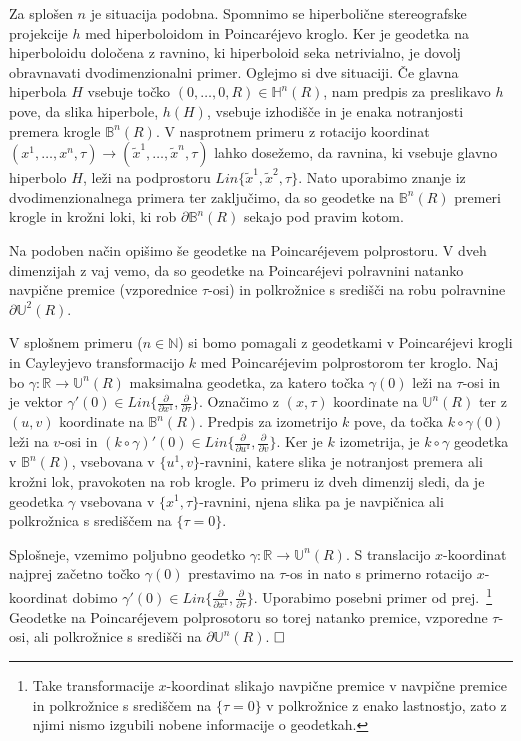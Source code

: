 \documentclass[a4paper]{article}
\def\qed{$\hfill\Box$}   %
\begin{document}
Za splošen $n$ je situacija podobna. Spomnimo se hiperbolične stereografske projekcije $h$ med hiperboloidom in Poincar\'ejevo kroglo. Ker je geodetka na hiperboloidu določena z ravnino, ki hiperboloid seka netrivialno, je dovolj obravnavati dvodimenzionalni primer. Oglejmo si dve situaciji. Če glavna hiperbola $H$ vsebuje točko $(0, \dots , 0,R) \in \mathbb{H}^{n}(R)$, nam predpis za preslikavo $h$ pove, da slika hiperbole, $h(H)$, vsebuje izhodišče in je enaka notranjosti premera krogle $\mathbb{B}^{n}(R)$. V nasprotnem primeru z rotacijo koordinat $(x^{1}, \dots , x^{n}, \tau) \to (\tilde{x}^{1}, \dots , \tilde{x}^{n}, \tau)$ lahko dosežemo, da ravnina, ki vsebuje glavno hiperbolo $H$, leži na podprostoru $\mathit{Lin} \{ \tilde{x}^{1}, \tilde{x}^{2}, \tau \}$. Nato uporabimo znanje iz dvodimenzionalnega primera ter zaključimo, da so geodetke na $\mathbb{B}^{n}(R)$ premeri krogle in krožni loki, ki rob $\partial \mathbb{B}^{n}(R)$ sekajo pod pravim kotom.\newline

Na podoben način opišimo še geodetke na Poincar\'ejevem polprostoru.
V dveh dimenzijah z vaj vemo, da so geodetke na Poincar\'ejevi polravnini natanko navpične premice (vzporednice $\tau$-osi) in polkrožnice s središči na robu polravnine $\partial \mathbb{U}^{2}(R)$.

V splošnem primeru ($n \in \mathbb{N}$) si bomo pomagali z geodetkami v Poincar\'ejevi krogli in Cayleyjevo transformacijo $k$ med Poincar\'ejevim polprostorom ter kroglo.
%
Naj bo $\gamma \colon \mathbb{R} \to \mathbb{U}^{n}(R)$ maksimalna geodetka, za katero točka $\gamma(0)$ leži na $\tau$-osi in je vektor $\gamma'(0) \in \mathit{Lin} \{ \frac{\partial}{\partial x^{1}}, \frac{\partial}{\partial \tau} \}$.
Označimo z $(x,\tau)$ koordinate na $\mathbb{U}^{n}(R)$ ter z $(u,v)$ koordinate na $\mathbb{B}^{n}(R)$. Predpis za izometrijo $k$ pove, da točka $k \circ \gamma (0)$ leži na $v$-osi in $(k \circ \gamma)'(0) \in \mathit{Lin} \{ \frac{\partial}{\partial u^{1}}, \frac{\partial}{\partial v} \}$.
Ker je $k$ izometrija, je $k \circ \gamma$ geodetka v $\mathbb{B}^{n}(R)$, vsebovana v $\{u^{1},v \}$-ravnini, katere slika je notranjost premera ali krožni lok, pravokoten na rob krogle. Po primeru iz dveh dimenzij sledi, da je geodetka $\gamma$ vsebovana v $\{ x^{1}, \tau \}$-ravnini, njena slika pa je navpičnica ali polkrožnica s središčem na $\{ \tau = 0 \}$.

Splošneje, vzemimo poljubno geodetko $\gamma \colon \mathbb{R} \to \mathbb{U}^{n}(R)$. S translacijo $x$-koordinat najprej začetno točko $\gamma (0)$ prestavimo na $\tau$-os in nato s primerno rotacijo $x$-koordinat dobimo $\gamma'(0) \in \textit{Lin} \{ \frac{\partial}{\partial x^{1}}, \frac{\partial}{\partial \tau} \}$.
Uporabimo posebni primer od prej.~\footnote{Take transformacije $x$-koordinat slikajo navpične premice v navpične premice in polkrožnice s središčem na $\{ \tau =0 \}$ v polkrožnice z enako lastnostjo, zato z njimi nismo izgubili nobene informacije o geodetkah.}
Geodetke na Poincar\'ejevem polprosotoru so torej natanko premice, vzporedne $\tau$-osi, ali polkrožnice s središči na $\partial \mathbb{U}^{n}(R)$.
\qed
\end{document}
